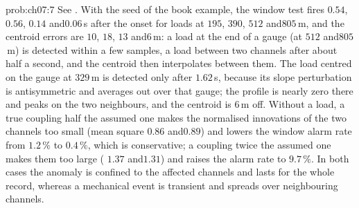 \begin{sol}{prob:ch07:7}
See . With the seed of the book example, the window test fires  $0.54$, $0.56$, $0.14$ and\allowbreak $0.06$\,s after the onset for loads at $195$, $390$, $512$ and\allowbreak $805$\,m, and the centroid errors are  $10$, $18$, $13$ and\allowbreak $6$\,m: a load at the end of a gauge (at $512$ and\allowbreak $805$\,m) is detected within a few samples, a load between two channels after about half a second, and the centroid then interpolates between them. The load centred on the gauge at $329$\,m is detected only after $1.62$\,s, because its slope perturbation is antisymmetric and averages out over that gauge; the profile is nearly zero there and peaks on the two neighbours, and the centroid is $6$\,m off. Without a load, a true coupling half the assumed one makes the normalised innovations of the two channels too small (mean square  $0.86$ and\allowbreak $0.89$) and lowers the window alarm rate from $1.2\,\%$ to $0.4\,\%$, which is conservative; a coupling twice the assumed one makes them too large ( $1.37$ and\allowbreak $1.31$) and raises the alarm rate to $9.7\,\%$. In both cases the anomaly is confined to the affected channels and lasts for the whole record, whereas a mechanical event is transient and spreads over neighbouring channels.
\end{sol}
